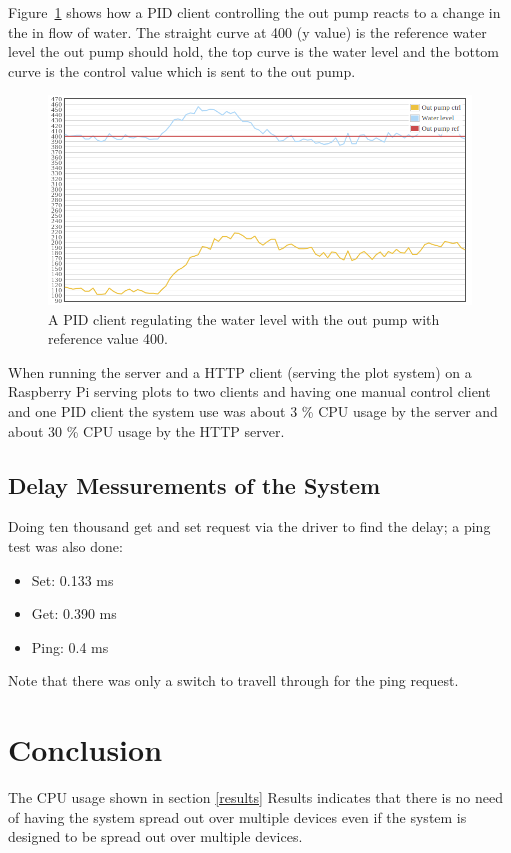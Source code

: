 \documentclass{article}
\begin{document}
Figure~\ref{fig:out pump} shows how a PID client controlling the out pump reacts
to a change in the in flow of water. The straight curve at 400 (y value) is the
reference water level the out pump should hold, the top curve is the water level
and the bottom curve is the control value which is sent to the out pump.

\begin{figure}[H]
\includegraphics[width=1.0\textwidth]{plot1.png}
\caption{A PID client regulating the water level with the out pump with reference value 400.}
\label{fig:out pump}
\end{figure}

When running the server and a HTTP client (serving the plot system) on a
Raspberry Pi serving plots to two clients and having one manual control client
and one PID client the system use was about 3 \% CPU usage by the server and 
about 30 \% CPU usage by the HTTP server.

\subsection{Delay Messurements of the System}
Doing ten thousand get and set request via the driver to find the delay; a ping test was also done: 
\begin{itemize}
\item{Set: 0.133 ms}
\item{Get: 0.390 ms}
\item{Ping: 0.4 ms} 
\end{itemize}

Note that there was only a switch to travell through for the ping request. 
\section{Conclusion}
The CPU usage shown in section \ref{results} Results indicates that there is no need of having
the system spread out over multiple devices even if the system is designed to be spread out over
multiple devices.
\end{document}
